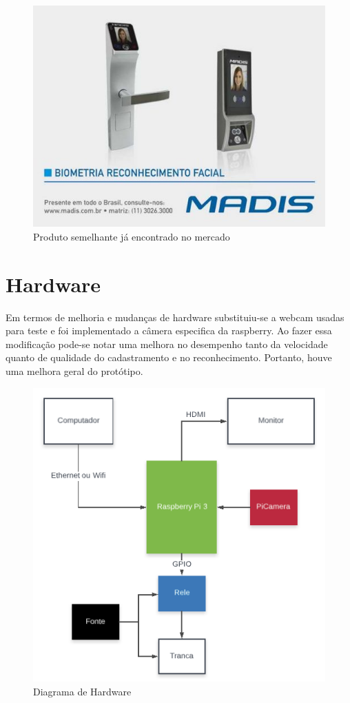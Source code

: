 \documentclass[conference,compsoc]{IEEEtran}
\begin{document}
\begin{figure}[!ht]
		\centering
		\includegraphics[scale=0.25]{exemplo.jpg}
		\caption{Produto semelhante já encontrado no mercado \cite{referencia:8}}
\end{figure}

 
 
 \section{Hardware}
 
Em termos de melhoria e mudanças de hardware substituiu-se a webcam usadas para teste e foi implementado a câmera especifica da raspberry. Ao fazer essa modificação pode-se notar uma melhora no desempenho tanto da velocidade quanto de qualidade do cadastramento e no reconhecimento. Portanto, houve uma melhora geral do protótipo.   
 
 \begin{figure}[!ht]
		\centering
		\includegraphics[scale=0.25]{diagrama_de_hardware.png}
		\caption{Diagrama de Hardware}
\end{figure}
\end{document}
